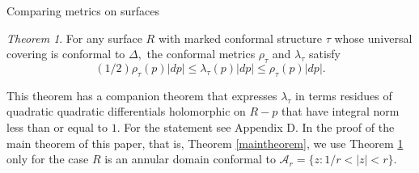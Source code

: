 \documentclass[12pt]{amsart}
\theoremstyle{remark}
\newtheorem{theorem}{Theorem}
\theoremstyle{definition}
\theoremstyle{definition}
\begin{document}
\begin{section}{Comparing metrics on surfaces}
\begin{theorem}\label{thm2} For any surface $R$ with marked conformal structure $\tau$ whose universal covering is conformal to $\Delta,$  the conformal metrics $\rho_{\tau}$ and $\lambda_{\tau}$ satisfy
\begin{equation}\label{equthm2}(1/2) \rho_{\tau}(p)|dp| \leq \lambda_{\tau}(p)|dp| \leq \rho_{\tau}(p)|dp|.\end{equation}
\end{theorem}

This theorem has a companion theorem that expresses $\lambda_{\tau}$ in terms residues of quadratic quadratic differentials holomorphic on $R-p$  that have integral norm less than or equal to $1.$  For the statement see  Appendix D. 
In the proof of the main theorem of this paper, that is, Theorem \ref{maintheorem}, we use Theorem  \ref{thm2} only for the case  $R$ is an annular domain conformal to  ${\mathcal A}_r = \{z : 1/r < |z| <r\}.$  
\end{section}
        
\end{document}
